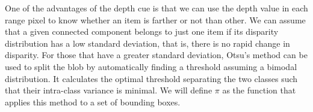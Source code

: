 \documentclass[10pt,twocolumn,letterpaper]{article}
\begin{document}

One of the advantages of the depth cue is that we can use the depth value in each range pixel to know whether an item is farther or not than other. We can assume that a given connected component belongs to just one item if its disparity distribution has a low standard deviation, that is, there is no rapid change in disparity. For those that have a greater standard deviation, Otsu's method \cite{otsu1975threshold} can be used to split the blob by automatically finding a threshold assuming a bimodal distribution. It calculates the optimal threshold separating the two classes such that their intra-class variance is minimal. We will define $\pi$ as the function that applies this method to a set of bounding boxes.
\end{document}
